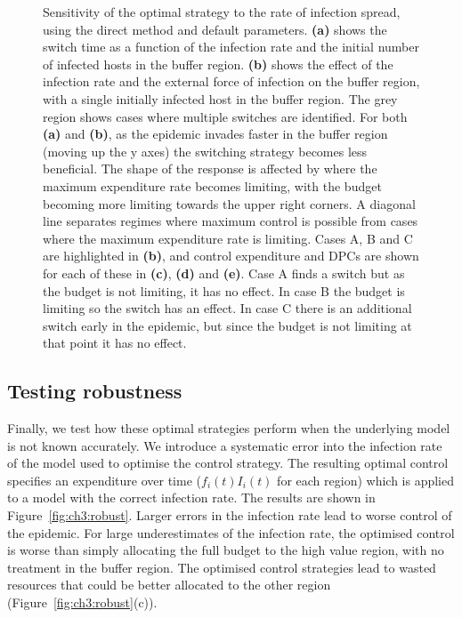 \begin{figure}[p]
    \begin{center}
        \caption[Switch time sensitivity to spread rate]{Sensitivity of the optimal strategy to the rate of infection spread, using the direct method and default parameters. \textbf{(a)} shows the switch time as a function of the infection rate and the initial number of infected hosts in the buffer region. \textbf{(b)} shows the effect of the infection rate and the external force of infection on the buffer region, with a single initially infected host in the buffer region. The grey region shows cases where multiple switches are identified. For both \textbf{(a)} and \textbf{(b)}, as the epidemic invades faster in the buffer region (moving up the y axes) the switching strategy becomes less beneficial. The shape of the response is affected by where the maximum expenditure rate becomes limiting, with the budget becoming more limiting towards the upper right corners. A diagonal line separates regimes where maximum control is possible from cases where the maximum expenditure rate is limiting. Cases A, B and C are highlighted in \textbf{(b)}, and control expenditure and DPCs are shown for each of these in \textbf{(c)}, \textbf{(d)} and \textbf{(e)}. Case A finds a switch but as the budget is not limiting, it has no effect. In case B the budget is limiting so the switch has an effect. In case C there is an additional switch early in the epidemic, but since the budget is not limiting at that point it has no effect.\label{fig:ch3:sens_1}}
    \end{center}
\end{figure}

\FloatBarrier
\newpage
\subsection{Testing robustness}

Finally, we test how these optimal strategies perform when the underlying model is not known accurately. We introduce a systematic error into the infection rate of the model used to optimise the control strategy. The resulting optimal control specifies an expenditure over time ($f_i(t)I_i(t)$ for each region) which is applied to a model with the correct infection rate. The results are shown in Figure~\ref{fig:ch3:robust}. Larger errors in the infection rate lead to worse control of the epidemic. For large underestimates of the infection rate, the optimised control is worse than simply allocating the full budget to the high value region, with no treatment in the buffer region. The optimised control strategies lead to wasted resources that could be better allocated to the other region (Figure~\ref{fig:ch3:robust}(c)).

